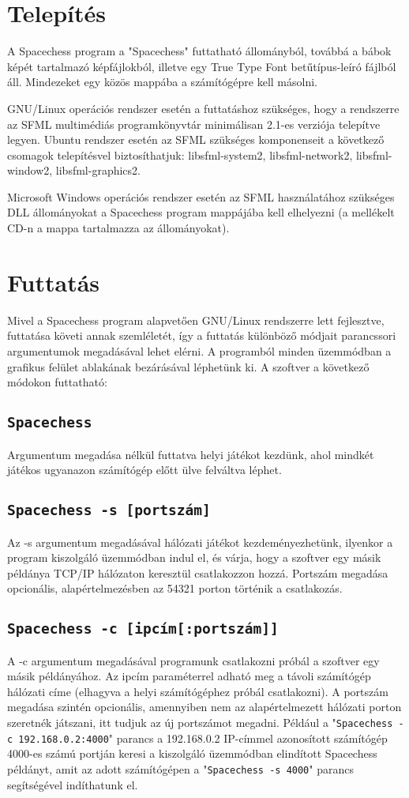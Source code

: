 \documentclass[12pt, twoside]{report}
\begin{document}
\section{Telepítés}

A Spacechess program a "Spacechess" futtatható állományból, továbbá a bábok képét tartalmazó képfájlokból, illetve egy True Type Font betűtípus-leíró fájlból áll. Mindezeket egy közös mappába a számítógépre kell másolni. 

GNU/Linux operációs rendszer esetén a futtatáshoz szükséges, hogy a rendszerre az SFML multimédiás programkönyvtár minimálisan 2.1-es verziója telepítve legyen. Ubuntu rendszer esetén az SFML szükséges komponenseit a következő csomagok telepítésvel biztosíthatjuk: libsfml-system2, libsfml-network2, libsfml-window2, libsfml-graphics2.

Microsoft Windows operációs rendszer esetén az SFML használatához szükséges DLL állományokat a Spacechess program mappájába kell elhelyezni (a mellékelt CD-n a mappa tartalmazza az állományokat). 

\section{Futtatás}	

Mivel a Spacechess program alapvetően GNU/Linux rendszerre lett fejlesztve, futtatása követi annak szemléletét, így a futtatás különböző módjait parancssori argumentumok megadásával lehet elérni. A programból minden üzemmódban a grafikus felület ablakának bezárásával léphetünk ki. A szoftver a következő módokon futtatható:
\subsection*{\tt Spacechess}
Argumentum megadása nélkül futtatva helyi játékot kezdünk, ahol mindkét játékos ugyanazon számítógép előtt ülve felváltva léphet.
\subsection*{\tt Spacechess -s [portszám]}
Az -s argumentum megadásával hálózati játékot kezdeményezhetünk, ilyenkor a program kiszolgáló üzemmódban indul el, és várja, hogy a szoftver egy másik példánya TCP/IP hálózaton keresztül csatlakozzon hozzá. Portszám megadása opcionális, alapértelmezésben az 54321 porton történik a csatlakozás.
\subsection*{\tt Spacechess -c [ipcím[:portszám]]}
A -c argumentum megadásával programunk csatlakozni próbál a szoftver egy másik példányához. Az ipcím paraméterrel adható meg a távoli számítógép hálózati címe (elhagyva a helyi számítógéphez próbál csatlakozni). A portszám megadása szintén opcionális, amennyiben nem az alapértelmezett hálózati porton szeretnék játszani, itt tudjuk az új portszámot megadni. Például a "{\tt Spacechess -c 192.168.0.2:4000}" parancs a 192.168.0.2 IP-címmel azonosított számítógép 4000-es számú portján keresi a kiszolgáló üzemmódban elindított Spacechess példányt, amit az adott számítógépen a "{\tt Spacechess -s 4000}" parancs segítségével indíthatunk el.
\end{document}
